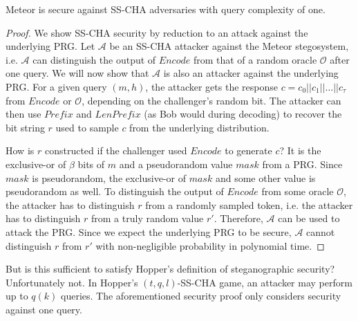 \begin{theorem}
  Meteor is secure against SS-CHA adversaries with query complexity of one.
\label{thm:meteor-secure}
\end{theorem}
\begin{proof}
  We show SS-CHA security by reduction to an attack against the underlying PRG.
  Let $\mathcal{A}$ be an SS-CHA attacker against the Meteor stegosystem, i.e. $\mathcal{A}$ can distinguish the output of $Encode$ from that of a random oracle $\mathcal{O}$ after one query.
  We will now show that $\mathcal{A}$ is also an attacker against the underlying PRG.
  For a given query $(m,h)$, the attacker gets the response $c = c_0 ||c_1 || \dots || c_{\tau}$ from $Encode$ or $\mathcal{O}$, depending on the challenger's random bit.
  The attacker can then use $Prefix$ and $LenPrefix$ (as Bob would during decoding) to recover the bit string $r$ used to sample $c$ from the underlying distribution.

  How is $r$ constructed if the challenger used $Encode$ to generate $c$?
  It is the exclusive-or of $\beta$ bits of $m$ and a pseudorandom value $mask$ from a PRG.
  Since $mask$ is pseudorandom, the exclusive-or of $mask$ and some other value is pseudorandom as well.
  To distinguish the output of $Encode$ from some oracle $\mathcal{O}$, the attacker has to distinguish $r$ from a randomly sampled token, i.e. the attacker has to distinguish $r$ from a truly random value $r'$.
  Therefore, $\mathcal{A}$ can be used to attack the PRG.
  Since we expect the underlying PRG to be secure, $\mathcal{A}$ cannot distinguish $r$ from $r'$ with non-negligible probability in polynomial time.
\end{proof}

But is this sufficient to satisfy Hopper's definition of steganographic security?
Unfortunately not.
In Hopper's $(t,q,l)$-SS-CHA game, an attacker may perform up to $q(k)$ queries.
The aforementioned security proof only considers security against one query.

